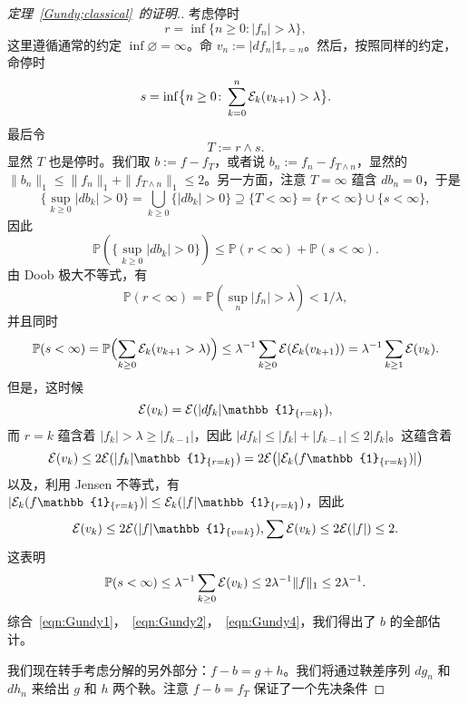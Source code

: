     \begin{proof}[定理~\ref{Gundy;classical}~的证明.]
        考虑停时
            \[r=\inf\{n\geq0\colon |f_n|>\lambda\},\]
        这里遵循通常的约定 $\inf\varnothing=\infty$。命 $v_n:=|df_n|\mathbb{1}_{r=n}$。然后，按照同样的约定，命停时
            \[s=\inf\bigl\{n\geq0\colon \sum_{k=0}^{n} \mathcal{E}_k(v_{k+1})>\lambda\bigr\}.\]
        最后令
            \[T:=r\wedge s.\]
        显然 $T$ 也是停时。我们取 $b:=f-f_T$，或者说 $b_n:=f_n-f_{T\wedge n}$，显然的 $\|b_n\|_1\leq \|f_n\|_1+\|f_{T\wedge n}\|_1\leq 2$。另一方面，注意 $T=\infty$ 蕴含 $db_n=0$，于是
            \[\{\sup_{k\geq0}|d b_k|>0\}=\bigcup_{k\geq0}\{|db_k|>0\}\supseteq \{T<\infty\}=\{r<\infty\}\cup\{s<\infty\},\]
        因此
        \begin{equation}\label{eqn:Gundy1}
            \mathbb{P}(\{\sup_{k\geq0}|d b_k|>0\})\leq \mathbb{P}(r<\infty)+\mathbb{P}(s<\infty).
        \end{equation}
        由 Doob 极大不等式，有
        \begin{equation}\label{eqn:Gundy2}
            \mathbb{P}(r<\infty)=\mathbb{P}(\sup_{n}|f_n|>\lambda)< 1/\lambda,
        \end{equation}
        并且同时
            \[            \mathbb{P}(s<\infty)=\mathbb{P}\Bigl(\sum_{k\geq0}\mathcal{E}_k(v_{k+1}>\lambda)\Bigr)
            \leq \lambda^{-1}\sum_{k\geq0}\mathcal{E}(\mathcal{E}_k(v_{k+1}))
            =\lambda^{-1}\sum_{k\geq1}\mathcal{E}(v_k).\]
        但是，这时候
            \[\E(v_k) = \E(|d f_k|\mathbb{1}_{\{r=k\}}),\]
        而 $r=k$ 蕴含着 $|f_k|>\lambda\geq |f_{k-1}|$，因此 $|df_k|\leq|f_k|+|f_{k-1}|\leq 2|f_k|$。这蕴含着
            \[            \E(v_k)\leq 2\E(|f_k|\mathbb{1}_{\{r=k\}})=2\E\bigl(|\E_k(f\mathbb{1}_{\{r=k\}})|\bigr)          \]
        以及，利用 Jensen 不等式，有 $|\E_k(f\mathbb{1}_{\{r=k\}})|\leq\E_{k}(|f|\mathbb{1}_{\{r=k\}})$，因此
        \begin{equation}\label{eqn:Gundy3}
            \E(v_k)\leq 2\E(|f|\mathbb{1}_{\{v=k\}}),\sum \E(v_k)\leq 2\E(|f|)\leq2.
        \end{equation}
        这表明
        \begin{equation}\label{eqn:Gundy4}
            \mathbb{P}(s<\infty)\leq\lambda^{-1}\sum_{k\geq0}\mathcal{E}(v_k)\leq 2\lambda^{-1}\|f\|_1\leq 2\lambda^{-1}.
        \end{equation}
        综合~\eqref{eqn:Gundy1}，~\eqref{eqn:Gundy2}，~\eqref{eqn:Gundy4}，我们得出了 $b$ 的全部估计。
        \par 我们现在转手考虑分解的另外部分：$f-b=g+h$。我们将通过鞅差序列 $dg_n$ 和 $dh_n$ 来给出 $g$ 和 $h$ 两个鞅。注意 $f-b=f_T$ 保证了一个先决条件

\end{proof}
